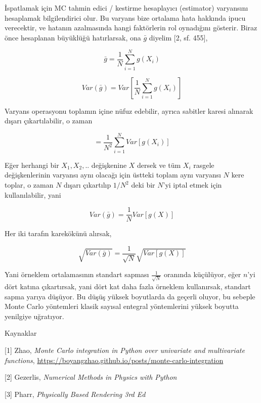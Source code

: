 \documentclass[12pt,fleqn]{article}\usepackage{../../common}
\begin{document}
İspatlamak için MC tahmin edici / kestirme hesaplayıcı (estimator) varyansını
hesaplamak bilgilendirici olur. Bu varyans bize ortalama hata hakkında ipucu
verecektir, ve hatanın azalmasında hangi faktörlerin rol oynadığını
gösterir. Biraz önce hesaplanan büyüklüğü hatırlarsak, ona $\bar{g}$
diyelim [2, sf. 455],

$$
\bar{g} = \frac{1}{N} \sum_{i=1}^{N} g(X_i)
$$

$$
Var(\bar{g}) = Var \left[ \frac{1}{N} \sum_{i=1}^{N} g(X_i)  \right]
$$

Varyans operasyonu toplamın içine nüfuz edebilir, ayrıca sabitler karesi
alınarak dışarı çıkartılabilir, o zaman

$$
= \frac{1}{N^2} \sum_{i=1}^{N} Var[ g(X_i)]  
$$

Eğer herhangi bir $X_1,X_2,..$ değişkenine $X$ dersek ve tüm $X_i$ rasgele
değişkenlerinin varyansı aynı olacağı için üstteki toplam aynı varyansı $N$
kere toplar, o zaman $N$ dışarı çıkartılıp $1/N^2$ deki bir $N$'yi iptal etmek
için kullanılabilir, yani 

$$
Var(\bar{g}) = \frac{1}{N} Var[ g(X)]  
$$

Her iki tarafın karekökünü alırsak,

$$
\sqrt{Var(\bar{g})} = \frac{1}{\sqrt{N}} \sqrt{Var[ g(X)]}
$$

Yani örneklem ortalamasının standart sapması $\frac{1}{\sqrt{N}}$ oranında
küçülüyor, eğer $n$'yi dört katına çıkartırsak, yani dört kat daha fazla
örneklem kullanırsak, standart sapma yarıya düşüyor. Bu düşüş yüksek boyutlarda
da geçerli oluyor, bu sebeple Monte Carlo yöntemleri klasik sayısal entegral
yöntemlerini yüksek boyutta yenilgiye uğratıyor.


Kaynaklar

[1] Zhao, {\em Monte Carlo integration in Python over univariate and multivariate functions},
    \url{https://boyangzhao.github.io/posts/monte-carlo-integration}

[2] Gezerlis, {\em Numerical Methods in Physics with Python}
    
[3] Pharr, {\em Physically Based Rendering 3rd Ed}
\end{document}
